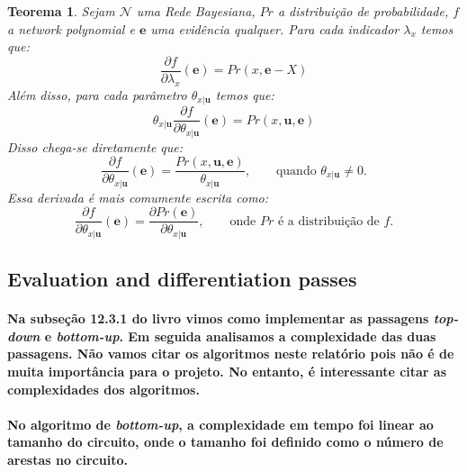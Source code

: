 \documentclass[a4paper,10pt]{article}
\theoremstyle{plain}
\newtheorem*{spn-thm}{Teorema}
\begin{document}
\begin{spn-thm} Sejam $\mathcal{N}$ uma Rede Bayesiana, $Pr$ a distribuição de probabilidade, $f$ a
\textit{network polynomial} e $\textbf{e}$ uma evidência qualquer. Para cada indicador $\lambda_x$
temos que:
\begin{equation}
\frac{\partial{f}}{\partial{\lambda_x}}(\textbf{e}) = Pr(x, \textbf{e} - X)
\end{equation}
Além disso, para cada parâmetro $\theta_{x|\textbf{u}}$ temos que:
\begin{equation}
\theta_{x|\textbf{u}}\frac{\partial{f}}{\partial{\theta_{x|\textbf{u}}}}(\textbf{e})=Pr(x,\textbf{u},\textbf{e})
\end{equation}
Disso chega-se diretamente que:
\begin{equation}
\frac{\partial{f}}{\partial{\theta_{x|\textbf{u}}}}(\textbf{e})=\frac{Pr(x,\textbf{u},\textbf{e})}{\theta_{x|\textbf{u}}},
\qquad \text{quando $\theta_{x|\textbf{u}} \neq 0$.}
\end{equation}
Essa derivada é mais comumente escrita como:
\begin{equation}
\frac{\partial{f}}{\partial{\theta_{x|\textbf{u}}}}(\textbf{e})=\frac{\partial{Pr(\textbf{e})}}{\partial{\theta_{x|\textbf{u}}}},
\qquad \text{onde $Pr$ é a distribuição de $f$.}
\end{equation}
\end{spn-thm}

\subsection{Evaluation and differentiation passes}

\paragraph{
  Na subseção 12.3.1 do livro vimos como implementar as passagens \textit{top-down} e
\textit{bottom-up}. Em seguida analisamos a complexidade das duas passagens. Não vamos citar os
algoritmos neste relatório pois não é de muita importância para o projeto. No entanto, é
interessante citar as complexidades dos algoritmos.
}

\paragraph{
  No algoritmo de \textit{bottom-up}, a complexidade em tempo foi linear ao tamanho do circuito,
onde o tamanho foi definido como o número de arestas no circuito.
}
\end{document}
